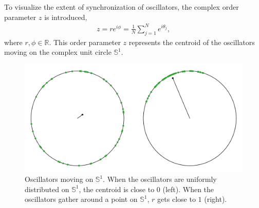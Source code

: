 To visualize the extent of synchronization of oscillators,
the complex order parameter $z$ is introduced,
\begin{align}
  z=re^{i\phi}=\frac{1}{N}\sum_{j=1}^{N}e^{i\theta_{j}},
\end{align}
where $r,\phi\in\mathbb{R}$.
This order parameter $z$ represents the centroid of the oscillators
moving on the complex unit circle $\mathbb{S}^{1}$.
\begin{figure}[htb]
  \begin{center}
    \includegraphics[width=14cm]{figs/order_disorder.pdf}
    \caption{Oscillators moving on $\mathbb{S}^{1}$.
    When the oscillators are uniformly distributed on $\mathbb{S}^{1}$,
    the centroid is close to $0$ (left).
    When the oscillators gather around a point on $\mathbb{S}^{1}$,
    $r$ gets close to $1$ (right).
    }
    \label{fig:circle}
  \end{center}
\end{figure}
